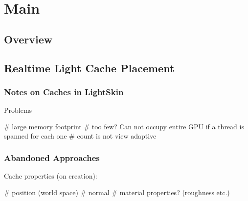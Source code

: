 \documentclass[thesis.tex]{subfiles}
\begin{document}
\chapter{Main}\label{chap:basics}

\section{Overview}

\section{Realtime Light Cache Placement}

\subsection{Notes on Caches in LightSkin}

Problems
\begin{easylist}[itemize]
# large memory footprint
# too few? Can not occupy entire GPU if a thread is spanned for each one
# count is not view adaptive
\end{easylist}

\subsection{Abandoned Approaches}
Cache properties (on creation):
\begin{easylist}[itemize]
# position (world space)
# normal
# material properties? (roughness etc.)
\end{easylist}
\end{document}
